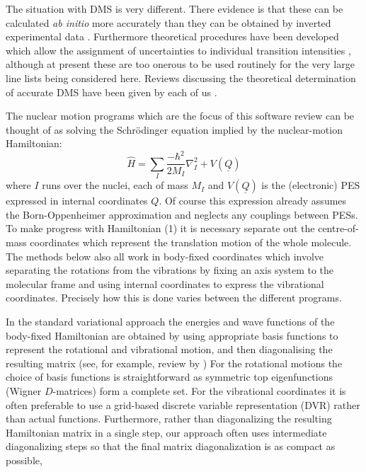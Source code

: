 \documentclass[12pt]{article}
\newcommand{\2}{$_{2}$}
\newcommand{\3}{$_{3}$}
\newcommand{\4}{$_{4}$}
\begin{document}
The situation with DMS is very different. There evidence is that
these can be calculated {\it ab initio} more accurately than they
can be obtained by inverted experimental data \cite{jt156}. Furthermore
theoretical procedures have been developed which allow the assignment
of uncertainties to individual
transition intensities \cite{jt522,jt625}, although at present these
are too onerous to be used routinely for the very large line lists being
considered here. Reviews discussing the theoretical determination
of accurate DMS have been given by each of us \cite{13Yuxxxx.method,jt573}.

The nuclear motion programs which are the focus of this software review can
be thought of as solving the Schr\"odinger equation implied
by the nuclear-motion Hamiltonian:
\begin{equation}
\hat{H} = \sum_I \frac{-\hbar^2}{2 M_I}\nabla_I^2 + V(\underline{Q})
\end{equation}
where $I$ runs over the nuclei, each of mass $M_I$ and $V(\underline{Q})$
is the (electronic) PES expressed in internal coordinates $Q$.
Of course this expression already assumes the Born-Oppenheimer approximation
and neglects any couplings between PESs. To make progress with
Hamiltonian (1) it is necessary separate out the centre-of-mass coordinates
which represent the translation motion of the whole molecule. The
methods below also all work in body-fixed coordinates which involve
separating the rotations from the vibrations by fixing an axis system
to the molecular frame and using internal coordinates to express the
vibrational coordinates. Precisely how this is done varies between
the different programs.

In the standard variational approach the energies and wave functions
of the body-fixed Hamiltonian are obtained by using appropriate basis
functions to represent the rotational and vibrational motion, and then
diagonalising the resulting matrix (see, for example, review by \cite{08BoCaMe.methods}) For the rotational motions the
choice of basis functions is straightforward as symmetric top eigenfunctions
(Wigner $D$-matrices) form a complete set. For the vibrational
coordinates it is often preferable to use a grid-based discrete
variable representation (DVR) \cite{lc00} rather than actual
functions. Furthermore, rather than diagonalizing the resulting
Hamiltonian matrix in a single step, our approach often uses
intermediate diagonalizing steps so that the final matrix diagonalization
is as compact as possible,
\end{document}
